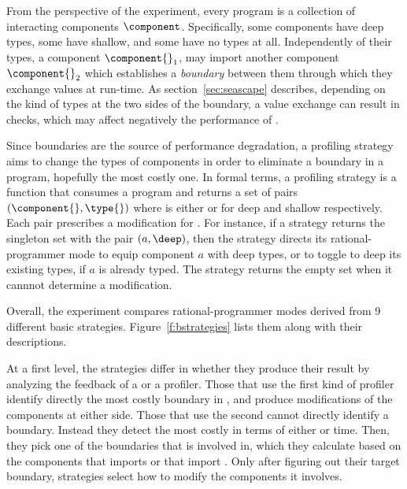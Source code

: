 
From the perspective of the experiment, every program \program{} is a
collection of interacting components $\component$. Specifically, some
components have deep types, some  have shallow, and some  have no types at
all. Independently of their types, a component $\component{}_1$, may import
another component $\component{}_2$  which establishes a
\emph{boundary} between them through which they exchange values at
run-time. As section~\ref{sec:seascape} describes, depending on the kind of types at
the two sides of the boundary, a value exchange can result in checks,
which may affect negatively the performance of \program{}. 

 Since boundaries are the source of performance degradation, a profiling
 strategy aims to change the types of components in order to eliminate a
 boundary in a program, hopefully the most costly one. In formal terms, a
 profiling strategy is a function that consumes a program \program{} and
 returns a set of pairs $(\component{}, \type{})$ where \type{} is either
 \deep{} or \shallow{} for deep and shallow respectively. Each pair
 prescribes a modification for \program{}. For instance, if a strategy
 returns the singleton set with the pair $(a,\deep)$, then the strategy
 directs its rational-programmer mode to equip component $a$ with deep
 types, or to toggle to deep its existing types, if $a$ is already
 typed. The strategy returns the empty set when it cannnot determine a
 modification.

 Overall, the experiment compares rational-programmer modes
 derived from 9 different basic strategies. Figure~\ref{f:bstrategies}
 lists them along with their descriptions.

 At a first level, the strategies
 differ in whether they produce their result by analyzing the feedback of
 a \featkw{} or a \statkw{} profiler. Those that use the first kind of
 profiler identify directly the most costly boundary in 
 \program{}, and produce modifications of the components at either side.
 Those that use the second cannot directly identify a boundary.  Instead
 they detect the most costly \component{} in terms of either \selfkw{} or
 \totalkw{} time.  Then, they pick  one of the boundaries that \component{} is
 involved in, which they calculate based on the components that
 \component{} imports or that import \component{}. Only after figuring out
 their target boundary, \statkw{} strategies select how to modify the
 components it involves.

